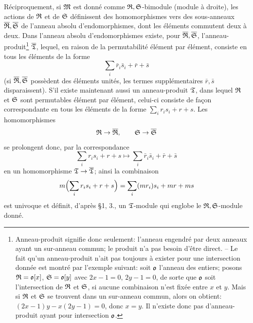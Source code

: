 Réciproquement, si \(\mathfrak M\) est donné comme \(\mathfrak R,\mathfrak S\)-bimodule (module à droite), les actions de \(\mathfrak R\) et de \(\mathfrak S\) définissent des homomorphismes vers des sous-anneaux \(\overline{\mathfrak R},\overline{\mathfrak S}\) de l'anneau absolu d'endomorphismes, dont les éléments commutent deux à deux. Dans l'anneau absolu d'endomorphismes existe, pour \(\overline{\mathfrak R},\overline{\mathfrak S}\), l'anneau-produit\footnote{Anneau-produit signifie donc seulement: l'anneau engendré par deux anneaux ayant un sur-anneau commun; le produit n'a pas besoin d'être direct. -- Le fait qu'un anneau-produit n'ait pas toujours à exister pour une intersection donnée est montré par l'exemple suivant: soit \(\mathfrak o\) l'anneau des entiers; posons \(\mathfrak R=\mathfrak o[x]\), \(\mathfrak S=\mathfrak o[y]\) avec \(2x-1=0\), \(2y-1=0\), de sorte que \(\mathfrak o\) soit l'intersection de \(\mathfrak R\) et \(\mathfrak S\), si aucune combinaison n'est fixée entre \(x\) et \(y\). Mais si \(\mathfrak R\) et \(\mathfrak S\) se trouvent dans un sur-anneau commun, alors on obtient: \((2x-1)y-x(2y-1)=0\), donc \(x=y\). Il n'existe donc pas d'anneau-produit ayant pour intersection \(\mathfrak o\).} \(\overline{\mathfrak T}\), lequel, en raison de la permutabilité élément par élément, consiste en tous les éléments de la forme
\[
        \sum_i \bar r_i\bar s_i+\bar r+\bar s
\]
(si \(\overline{\mathfrak R},\overline{\mathfrak S}\) possèdent des éléments unités, les termes supplémentaires \(\bar r,\bar s\) disparaissent). S'il existe maintenant aussi un anneau-produit \(\mathfrak T\), dans lequel \(\mathfrak R\) et \(\mathfrak S\) sont permutables élément par élément, celui-ci consiste de façon correspondante en tous les éléments de la forme \(\sum_i r_i s_i+r+s\). Les homomorphismes
\[
        \mathfrak R\to\overline{\mathfrak R},\qquad \mathfrak S\to\overline{\mathfrak S}
\]
se prolongent donc, par la correspondance
\[
        \sum_i r_i s_i+r+s
        \longmapsto
        \sum_i \bar r_i\bar s_i+\bar r+\bar s
\]
en un homomorphisme \(\mathfrak T\to\overline{\mathfrak T}\); ainsi la combinaison
\[
        m\Bigl(\sum_i r_i s_i+r+s\Bigr)
        =\sum_i (m r_i)s_i+m r+m s
\]
est univoque et définit, d'après \S 1, 3., un \(\mathfrak T\)-module qui englobe le \(\mathfrak R,\mathfrak S\)-module donné.

\clearpage

